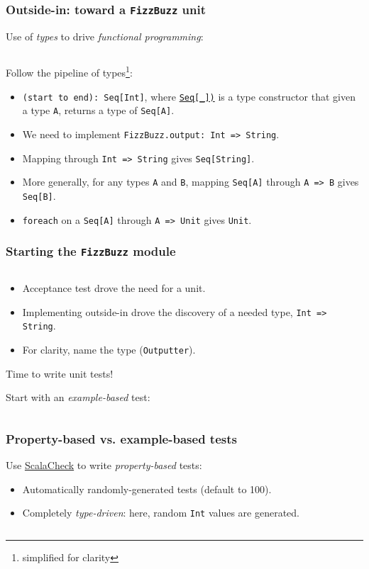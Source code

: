 \begin{frame}[fragile]
  \frametitle{Outside-in: toward a \texttt{FizzBuzz} unit}

  Use of \emph{types} to drive \emph{functional programming}:
  \inputminted{scala}{Main4.scala}

  Follow the pipeline of types\footnote{simplified for clarity}:
  \begin{itemize}
  \item \texttt{(start to end): Seq[Int]}, where \href{http://www.scala-lang.org/api/2.11.0/index.html\#scala.collection.Seq}{\texttt{Seq[\_])}} is a type constructor that given a type \texttt{A}, returns a type of \texttt{Seq[A]}.
  \item We need to implement \texttt{FizzBuzz.output: Int => String}.
  \item Mapping through \texttt{Int => String} gives \texttt{Seq[String]}.
  \item More generally, for any types \texttt{A} and \texttt{B}, mapping \texttt{Seq[A]} through \texttt{A => B} gives \texttt{Seq[B]}.
  \item \texttt{foreach} on a \texttt{Seq[A]} through \texttt{A => Unit} gives \texttt{Unit}.
  \end{itemize}
\end{frame}

\begin{frame}[fragile]
  \frametitle{Starting the \texttt{FizzBuzz} module}

  \inputminted{scala}{FizzBuzz1.scala}

  \begin{itemize}
  \item Acceptance test drove the need for a unit.
  \item Implementing outside-in drove the discovery of a needed type, \texttt{Int => String}.
  \item For clarity, name the type (\texttt{Outputter}).
  \end{itemize}

  Time to write unit tests!

  Start with an \emph{example-based} test:
  \inputminted{scala}{FizzBuzzSpec1.scala}
\end{frame}

\begin{frame}[fragile]
  \frametitle{Property-based vs. example-based tests}

  Use \href{http://scalacheck.org/}{ScalaCheck} to write \emph{property-based} tests:
  \begin{itemize}
  \item Automatically randomly-generated tests (default to 100).
  \item Completely \emph{type-driven}: here, random \texttt{Int} values are generated.
  \end{itemize}

  \inputminted{scala}{FizzBuzzSpec2.scala}
\end{frame}

